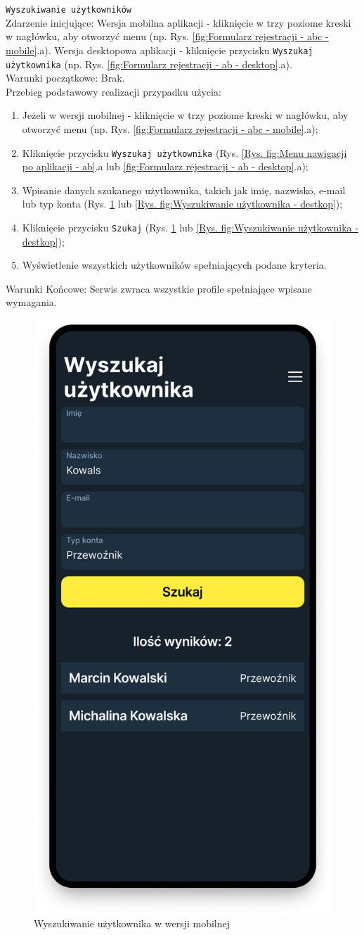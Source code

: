 \texttt{Wyszukiwanie użytkowników} \\
Zdarzenie inicjujące: Wersja mobilna aplikacji - kliknięcie w trzy poziome kreski w nagłówku, aby otworzyć menu (np. Rys. \ref{fig:Formularz rejestracji - abc - mobile}.a). Wersja desktopowa aplikacji - kliknięcie przycisku \texttt{Wyszukaj użytkownika} (np. Rys. \ref{fig:Formularz rejestracji - ab - desktop}.a). \\
Warunki początkowe: Brak. \\
Przebieg podstawowy realizacji przypadku użycia:
\begin{enumerate}
    \item Jeżeli w wersji mobilnej - kliknięcie w trzy poziome kreski w nagłówku, aby otworzyć menu (np. Rys. \ref{fig:Formularz rejestracji - abc - mobile}.a);
    \item Kliknięcie przycisku \texttt{Wyszukaj użytkownika} (Rys. \ref{Rys. fig:Menu nawigacji po aplikacji - ab}.a lub \ref{fig:Formularz rejestracji - ab - desktop}.a);
    \item Wpisanie danych szukanego użytkownika, takich jak imię, nazwisko, e-mail lub typ konta (Rys. \ref{Rys. fig:Wyszukiwanie użytkownika - mobile} lub \ref{Rys. fig:Wyszukiwanie użytkownika - destkop});
    \item Kliknięcie przycisku \texttt{Szukaj} (Rys. \ref{Rys. fig:Wyszukiwanie użytkownika - mobile} lub \ref{Rys. fig:Wyszukiwanie użytkownika - destkop});
    \item Wyświetlenie wszystkich użytkowników spełniających podane kryteria.
\end{enumerate}
Warunki Końcowe: Serwis zwraca wszystkie profile spełniające wpisane wymagania.\\
\begin{figure}[H]
	\centering
		\includegraphics[width=0.3\linewidth]{rozdzial1/szukaj_uzytkownika_m.png}
	\caption{Wyszukiwanie użytkownika w wersji mobilnej}
	\label{Rys. fig:Wyszukiwanie użytkownika - mobile}
\end{figure}
